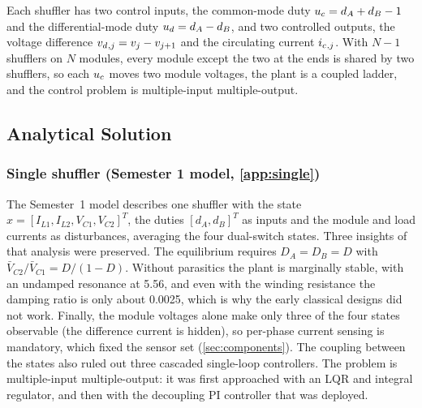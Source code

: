Each shuffler has two control inputs, the common-mode duty $u_{c} = d_A + d_B - 1$ and the differential-mode duty $u_{d} = d_A - d_B$, and two controlled outputs, the voltage difference $v_{d}{}_{,j} = v_j - v_{j+1}$ and the circulating current $i_{c}{}_{,j}$. With $N-1$ shufflers on $N$ modules, every module except the two at the ends is shared by two shufflers, so each $u_{c}$ moves two module voltages, the plant is a coupled ladder, and the control problem is multiple-input multiple-output.

\subsection{Analytical Solution}
\label{sec:analytical}

\subsubsection*{Single shuffler (Semester 1 model, \cref{app:single})}
The Semester~1 model describes one shuffler with the state $x = [I_{L1}, I_{L2}, V_{C1}, V_{C2}]^T$, the duties $[d_A, d_B]^T$ as inputs and the module and load currents as disturbances, averaging the four dual-switch states. Three insights of that analysis were preserved. The equilibrium requires $D_A = D_B = D$ with $\bar V_{C2}/\bar V_{C1} = D/(1-D)$. Without parasitics the plant is marginally stable, with an undamped resonance at 5.56\kHz, and even with the winding resistance the damping ratio is only about 0.0025, which is why the early classical designs did not work. Finally, the module voltages alone make only three of the four states observable (the difference current is hidden), so per-phase current sensing is mandatory, which fixed the sensor set (\cref{sec:components}). The coupling between the states also ruled out three cascaded single-loop controllers. The problem is multiple-input multiple-output: it was first approached with an LQR and integral regulator, and then with the decoupling PI controller that was deployed.

